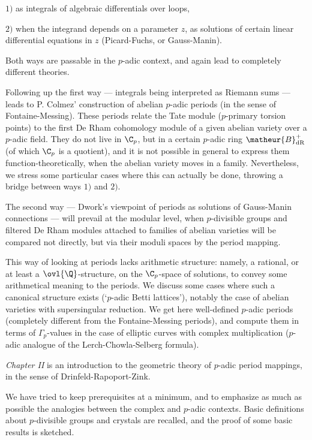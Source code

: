 $1)$ as integrals of algebraic differentials over loops, 

$2)$ when the integrand depends on a parameter $z$, as solutions of
certain linear differential equations in $z$ (Picard-Fuchs, or Gauss-Manin).

\medskip

Both ways are passable in the $p$-adic context, and again lead
to completely different theories. 

Following up the first way --- integrals being interpreted as Riemann sums
--- leads to P. Colmez' construction of abelian $p$-adic periods (in the
sense of Fontaine-Messing). These periods relate the Tate module 
($p$-primary torsion points) to the first De Rham cohomology module of
a given abelian variety over a $p$-adic field. They do not live in
$\C_p$, but in a certain $p$-adic ring $\matheur{B}^+_{\mathrm{dR}}$ (of which
$\C_p$ is a quotient), and it is not possible in general to express them 
function-theoretically, when the abelian variety moves in a
family. Nevertheless, we stress some particular cases where this can
actually be done, throwing a bridge between ways $1)$ and $2)$. 

The second way --- Dwork's viewpoint of periods as solutions of
Gauss-Manin connections --- will prevail at the modular level, when
$p$-divisible groups and filtered De Rham modules attached to families
of abelian varieties will be compared not directly, but via their moduli
spaces by the period mapping.

This way of looking at periods lacks arithmetic structure: namely, a
rational, or at least a $\ovl{\Q}$-structure, on the $\C_p$-space of
solutions, to convey some arithmetical meaning to the periods. We
discuss some cases where such a canonical structure exists (`$p$-adic
Betti lattices'), notably the case of abelian varieties with
supersingular reduction. We get here well-defined $p$-adic periods
(completely different from the Fontaine-Messing periods), and compute
them in terms of $\Gamma_p$-values in the case of elliptic curves with
complex multiplication ($p$-adic analogue of the Lerch-Chowla-Selberg
formula).


\bigskip

{\it Chapter II} is an introduction to the geometric theory of $p$-adic
period mappings, in the sense of Drinfeld-Rapoport-Zink.

We have tried to keep prerequisites at a minimum, and to emphasize as
much as possible the analogies between the complex and $p$-adic
contexts. Basic definitions about $p$-divisible groups and crystals are
recalled, and the proof of some basic results is sketched.


